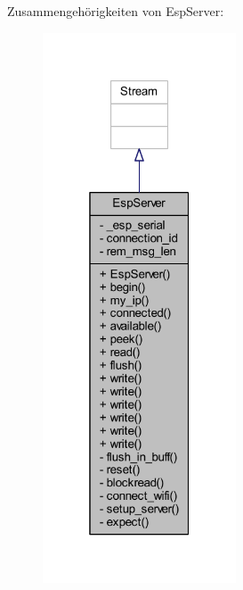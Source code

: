 Zusammengehörigkeiten von Esp\+Server\+:\nopagebreak
\begin{figure}[H]
\begin{center}
\leavevmode
\includegraphics[width=163pt]{class_esp_server__coll__graph}
\end{center}
\end{figure}
